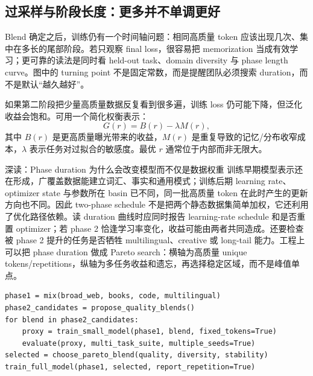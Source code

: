 \subsection{过采样与阶段长度：更多并不单调更好}

Blend 确定之后，训练仍有一个时间轴问题：相同高质量 token 应该出现几次、集中在多长的尾部阶段。若只观察 final loss，很容易把 memorization 当成有效学习；更可靠的读法是同时看 held-out task、domain diversity 与 phase length curve。图中的 turning point 不是固定常数，而是提醒团队必须搜索 duration，而不是默认“越久越好”。

如果第二阶段把少量高质量数据反复看到很多遍，训练 loss 仍可能下降，但泛化收益会饱和。可用一个简化权衡表示：
\[
G(r)=B(r)-\lambda M(r),
\]
其中 $B(r)$ 是更高质量曝光带来的收益，$M(r)$ 是重复导致的记忆/分布收窄成本，$\lambda$ 表示任务对过拟合的敏感度。最优 $r$ 通常位于内部而非无限大。







\begin{knowledgebox}{深读：Phase duration 为什么会改变模型而不仅是数据权重}
训练早期模型表示还在形成，广覆盖数据能建立词汇、事实和通用模式；训练后期 learning rate、optimizer state 与参数所在 basin 已不同，同一批高质量 token 在此时产生的更新方向也不同。因此 two-phase schedule 不是把两个静态数据集简单加权，它还利用了优化路径依赖。读 duration 曲线时应同时报告 learning-rate schedule 和是否重置 optimizer；若 phase 2 恰逢学习率变化，收益可能由两者共同造成。还要检查被 phase 2 提升的任务是否牺牲 multilingual、creative 或 long-tail 能力。工程上可以把 phase duration 做成 Pareto search：横轴为高质量 unique tokens/repetitions，纵轴为多任务收益和遗忘，再选择稳定区域，而不是峰值单点。
\end{knowledgebox}


\begin{lstlisting}[caption={Two-phase data schedule 的可复现实验骨架}]
phase1 = mix(broad_web, books, code, multilingual)
phase2_candidates = propose_quality_blends()
for blend in phase2_candidates:
    proxy = train_small_model(phase1, blend, fixed_tokens=True)
    evaluate(proxy, multi_task_suite, multiple_seeds=True)
selected = choose_pareto_blend(quality, diversity, stability)
train_full_model(phase1, selected, report_repetition=True)
\end{lstlisting}

